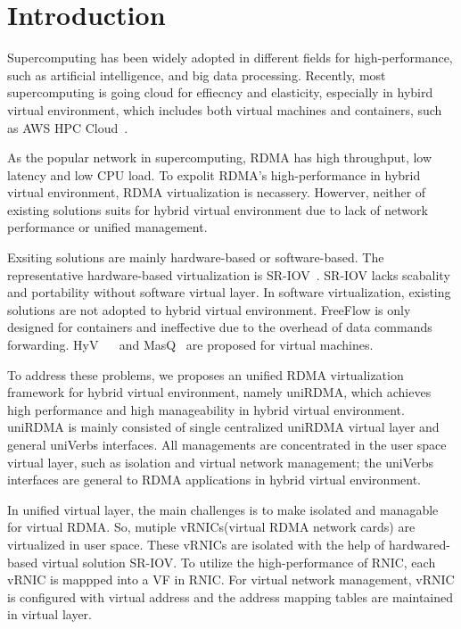 \section{Introduction}
 Supercomputing has been widely adopted in different fields for high-performance, such as artificial intelligence, and big data processing. Recently, most supercomputing is going cloud for effiecncy and elasticity, especially in hybird virtual environment, which includes both virtual machines and containers, such as AWS HPC Cloud~\cite{aws-hpc}. 

As the popular network in supercomputing, RDMA has high throughput, low latency and low CPU load. To expolit RDMA's high-performance in hybrid virtual environment, RDMA virtualization is necassery. Howerver, neither of existing solutions suits for hybrid virtual environment due to lack of network performance or unified management.

Exsiting solutions are mainly hardware-based or software-based. The representative hardware-based virtualization is SR-IOV~\cite{sr-iov}. SR-IOV lacks scabality and portability without software virtual layer. In software virtualization, existing solutions are not adopted to hybrid virtual environment. FreeFlow is only designed for containers and ineffective due to the overhead of data commands forwarding.  HyV~\cite{pfefferle2015hybrid} ~\cite{pfefferle2014vverbs} and MasQ~\cite{he2020masq} are proposed for virtual machines.

To address these problems, we proposes an unified RDMA virtualization framework for hybrid virtual environment, namely uniRDMA, which achieves high performance and high manageability in hybrid virtual environment. uniRDMA is mainly consisted of single centralized uniRDMA virtual layer and general uniVerbs interfaces. All managements are concentrated in the user space virtual layer, such as isolation and virtual network management; the uniVerbs interfaces are general to RDMA applications in hybrid virtual environment. 

In unified virtual layer, the main challenges is to make isolated and managable for virtual RDMA. So, mutiple vRNICs(virtual RDMA network cards) are virtualized in user space. These vRNICs are isolated with the help of hardwared-based virtual solution SR-IOV. To utilize the high-performance of RNIC, each vRNIC is mappped into a VF in RNIC. For virtual network management, vRNIC is configured with virtual address and the address mapping tables are maintained in virtual layer.

